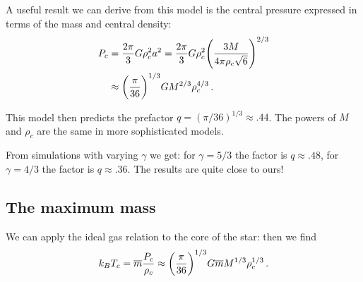 \documentclass[main.tex]{subfiles}
\begin{document}

%


A useful result we can derive from this model is the central pressure expressed in terms of the mass and central density:
%
\begin{align}
  P_c &= \frac{2 \pi }{3} G \rho _c^2a^2 = \frac{2 \pi }{3} G \rho _c^2 \qty(\frac{3M}{4 \pi \rho _c \sqrt{6}})^{2/3} \\
  &\approx \qty(\frac{\pi }{36})^{1/3} G M^{2/3} \rho _c^{4/3}
\,.
\end{align}

This model then predicts the prefactor \(q = (\pi / 36)^{1/3} \approx \num{.44}\). The powers of \(M\) and \(\rho _c\) are the same in more sophisticated models.

From simulations with varying \(\gamma \)  we get: for \(\gamma = 5/3 \) the factor is \(q \approx \num{.48}\), for \(\gamma = 4/3\) the factor is \(q \approx \num{.36}\). 
The results are quite close to ours!


\subsection{The maximum mass}

We can apply the ideal gas relation to the core of the star: then we find 
%
\begin{align}
  k_B T_c 
  = \overline{m} \frac{P_c}{\rho _c}
  \approx  \qty(\frac{\pi }{36 })^{1/3} G \overline{m} M^{1/3} \rho _c^{1/3}
\,.
\end{align}

\end{document}
